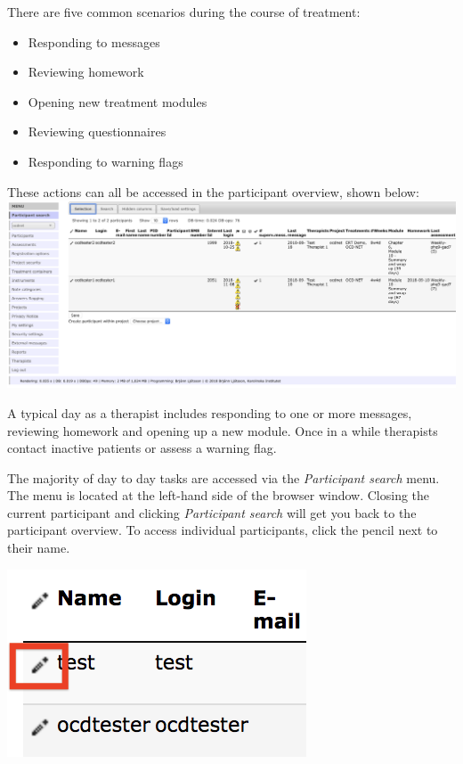 \documentclass[]{book}
\providecommand{\tightlist}{%
  \setlength{\itemsep}{0pt}\setlength{\parskip}{0pt}}
\theoremstyle{definition}
\theoremstyle{definition}
\theoremstyle{definition}
\theoremstyle{remark}
\begin{document}
There are five common scenarios during the course of treatment:

\begin{itemize}
\tightlist
\item
  Responding to messages
\item
  Reviewing homework
\item
  Opening new treatment modules
\item
  Reviewing questionnaires
\item
  Responding to warning flags
\end{itemize}

These actions can all be accessed in the participant overview, shown
below: \includegraphics{images/participant-overview.png}

A typical day as a therapist includes responding to one or more
messages, reviewing homework and opening up a new module. Once in a
while therapists contact inactive patients or assess a warning flag.

The majority of day to day tasks are accessed via the \emph{Participant
search} menu. The menu is located at the left-hand side of the browser
window. Closing the current participant and clicking \emph{Participant
search} will get you back to the participant overview. To access
individual participants, click the pencil next to their name.

\includegraphics{images/pencil.png}
\end{document}
